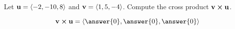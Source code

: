\documentclass{ximera}
\author{Gregory Hartman \and Matthew Carr}
\begin{document}
\begin{exercise}



Let $\mathbf{u}=\left\langle -2,-10,8\right\rangle$ and $\mathbf{v}=\left\langle 1,5,-4\right\rangle$. Compute the cross product $\mathbf{v} \boldsymbol\times \mathbf{u}$.

\begin{prompt}
\[
\vec{v}\cross\vec{u}=\vector{\answer{0},\answer{0},\answer{0}}
\]
\end{prompt}


\end{exercise}
\end{document}
